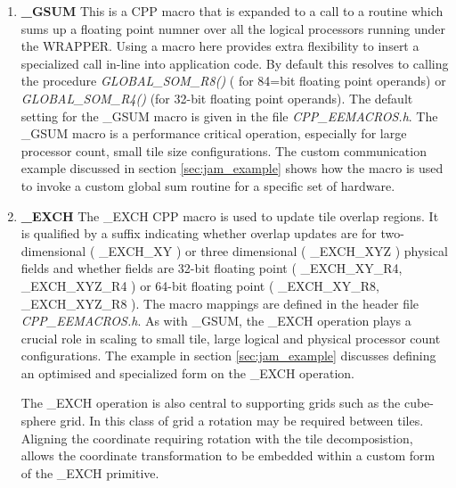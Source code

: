 \begin{enumerate}
\item {\bf \_GSUM}
This is a CPP macro that is expanded to a call to a routine
which sums up a floating point numner
over all the logical processors running under the
WRAPPER. Using a macro here provides extra flexibility to insert
a specialized call in-line into application code. By default this
resolves to calling the procedure {\em GLOBAL\_SOM\_R8()} ( for
84=bit floating point operands)
or {\em GLOBAL\_SOM\_R4()} (for 32-bit floating point operands). The default
setting for the \_GSUM macro is given in the file {\em CPP\_EEMACROS.h}.
The \_GSUM macro is a performance critical operation, especially for
large processor count, small tile size configurations.
The custom communication example discussed in section \ref{sec:jam_example}
shows how the macro is used to invoke a custom global sum routine
for a specific set of hardware.

\item {\bf \_EXCH}
The \_EXCH CPP macro is used to update tile overlap regions.
It is qualified by a suffix indicating whether overlap updates are for
two-dimensional ( \_EXCH\_XY ) or three dimensional ( \_EXCH\_XYZ )
physical fields and whether fields are 32-bit floating point
( \_EXCH\_XY\_R4, \_EXCH\_XYZ\_R4 ) or 64-bit floating point
( \_EXCH\_XY\_R8, \_EXCH\_XYZ\_R8 ). The macro mappings are defined
in the header file {\em CPP\_EEMACROS.h}. As with \_GSUM, the 
\_EXCH operation plays a crucial role in scaling to small tile,
large logical and physical processor count configurations.
The example in section \ref{sec:jam_example} discusses defining an
optimised and specialized form on the \_EXCH operation.

The \_EXCH operation is also central to supporting grids such as
the cube-sphere grid. In this class of grid a rotation may be required
between tiles. Aligning the coordinate requiring rotation with the
tile decomposistion, allows the coordinate transformation to 
be embedded within a custom form of the \_EXCH primitive.


\end{enumerate}
